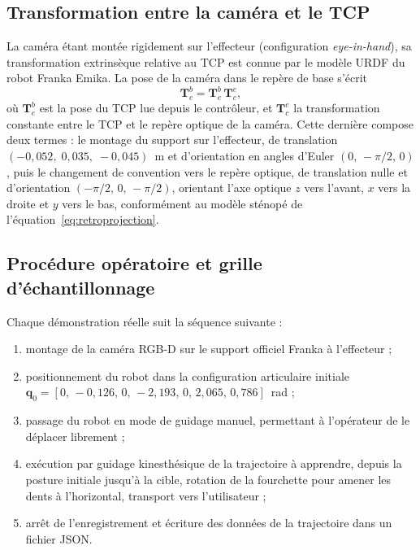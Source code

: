 \subsection*{Transformation entre la caméra et le \ac{TCP}} La caméra étant montée rigidement sur l'effecteur (configuration \textit{eye-in-hand}), sa transformation extrinsèque relative au \ac{TCP} est connue par le modèle \ac{URDF} du robot Franka Emika. La pose de la caméra dans le repère de base s'écrit
\begin{equation}\label{eq:calib_ee}
  \mathbf{T}_{c}^{b} = \mathbf{T}_{e}^{b} \, \mathbf{T}_{c}^{e},
\end{equation}
où $\mathbf{T}_{e}^{b}$ est la pose du \ac{TCP} lue depuis le contrôleur, et $\mathbf{T}_{c}^{e}$ la transformation constante entre le \ac{TCP} et le repère optique de la caméra. Cette dernière compose deux termes : le montage du support sur l'effecteur, de translation $(-0{,}052,\;0{,}035,\;-0{,}045)$~m et d'orientation en angles d'Euler $(0,\,-\pi/2,\,0)$, puis le changement de convention vers le repère optique, de translation nulle et d'orientation $(-\pi/2,\,0,\,-\pi/2)$, orientant l'axe optique $z$ vers l'avant, $x$ vers la droite et $y$ vers le bas, conformément au modèle sténopé de l'équation~\eqref{eq:retroprojection}.

\subsection*{Procédure opératoire et grille d'échantillonnage} Chaque démonstration réelle suit la séquence suivante :
\begin{enumerate}
  \item montage de la caméra \ac{RGB-D} sur le support officiel Franka à l'effecteur ;
  \item positionnement du robot dans la configuration articulaire initiale \\ $\mathbf{q}_0=[0,\,-0{,}126,\,0,\,-2{,}193,\,0,\,2{,}065,\,0{,}786]$~rad ;
  \item passage du robot en mode de guidage manuel, permettant à l'opérateur de le déplacer librement ;
  \item exécution par guidage kinesthésique de la trajectoire à apprendre, depuis la posture initiale jusqu'à la cible, rotation de la fourchette pour amener les dents à l'horizontal, transport vers l'utilisateur ;
  \item arrêt de l'enregistrement et écriture des données de la trajectoire dans un fichier \ac{JSON}.
\end{enumerate}

